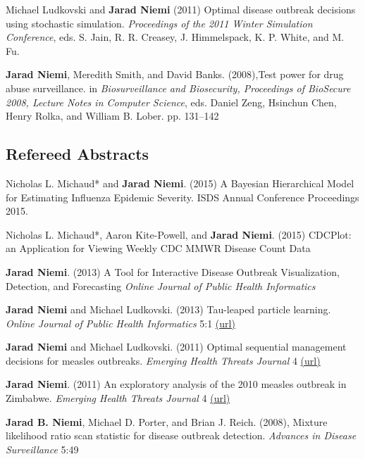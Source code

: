 \documentclass[overlapped,line]{res}
\begin{document}
\begin{resume}
Michael Ludkovski and {\bf Jarad Niemi} (2011) Optimal disease outbreak decisions using stochastic simulation. \emph{Proceedings of the 2011 Winter Simulation Conference}, eds. S. Jain, R. R. Creasey, J. Himmelspack, K. P. White, and M. Fu.

{\bf Jarad Niemi}, Meredith Smith, and David Banks. (2008),Test power for drug abuse surveillance. in \emph{Biosurveillance and Biosecurity, Proceedings of BioSecure 2008, Lecture Notes in Computer Science},  eds. Daniel Zeng, Hsinchun Chen, Henry Rolka, and William B. Lober. pp. 131--142



\subsection{\bf Refereed Abstracts}

Nicholas L. Michaud* and {\bf Jarad Niemi}. (2015) A Bayesian Hierarchical Model for Estimating Influenza Epidemic Severity. ISDS Annual Conference Proceedings 2015.

Nicholas L. Michaud*, Aaron Kite-Powell, and {\bf Jarad Niemi}. (2015) CDCPlot: an Application for Viewing Weekly CDC MMWR Disease Count Data

{\bf Jarad Niemi}. (2013) A Tool for Interactive Disease Outbreak Visualization, Detection, and Forecasting \emph{Online Journal of Public Health Informatics}

{\bf Jarad Niemi} and Michael Ludkovski. (2013) Tau-leaped particle learning. \emph{Online Journal of Public Health Informatics} 5:1 \href{http://dx.doi.org/10.5210%2Fojphi.v5i1.4575}{(url)}




{\bf Jarad Niemi} and Michael Ludkovski. (2011) Optimal sequential management decisions for measles outbreaks. \emph{Emerging Health Threats Journal} 4 \href{http://dx.doi.org/10.3402/ehtj.v4i0.11907}{(url)}




{\bf Jarad Niemi}. (2011) An exploratory analysis of the 2010 measles outbreak in Zimbabwe. \emph{Emerging Health Threats Journal} 4 \href{http://dx.doi.org/10.3402/ehtj.v4i0.11907}{(url)}


{\bf Jarad B. Niemi}, Michael D. Porter, and Brian J. Reich. (2008), Mixture likelihood ratio scan statistic for disease outbreak detection. \emph{Advances in Disease Surveillance} 5:49




\end{resume}
\end{document}
